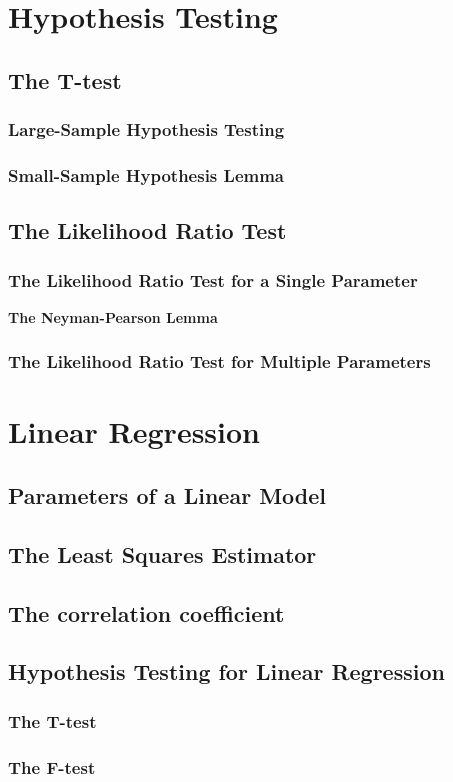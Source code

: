 \documentclass[sn-mathphys,Numbered]{sn-jnl}%
\begin{document}
\section{Hypothesis Testing}\label{hypothesis-testing}
\subsection{The T-test}\label{t-test}
\subsubsection{Large-Sample Hypothesis Testing}\label{large-sample-testing}
\subsubsection{Small-Sample Hypothesis Lemma}\label{small-sample-testing}

\subsection{The Likelihood Ratio Test}\label{likelihood-ratio}
\subsubsection{The Likelihood Ratio Test for a Single Parameter}\label{single-param}
\textbf{The Neyman-Pearson Lemma}
\subsubsection{The Likelihood Ratio Test for Multiple Parameters}\label{multiple-param}

\section{Linear Regression}\label{linear-regression}
\subsection{Parameters of a Linear Model}\label{linear-model}
\subsection{The Least Squares Estimator}\label{least-squares}
\subsection{The correlation coefficient}\label{correlation}
\subsection{Hypothesis Testing for Linear Regression}\label{linear-hypothesis}
\subsubsection{The T-test}\label{t-test}
\subsubsection{The F-test}\label{f-test}
\end{document}
